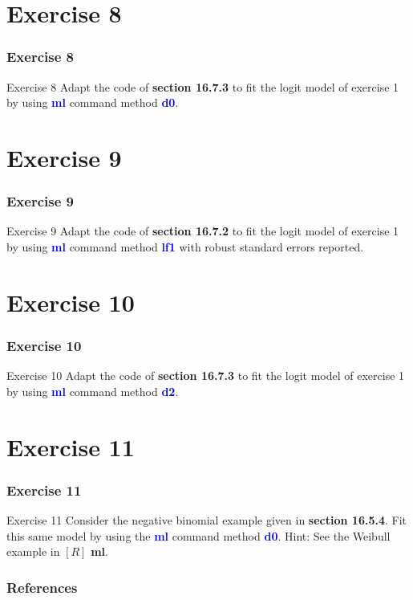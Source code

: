 \documentclass[11pt, aspectratio=169]{beamer}
\begin{document}
	\section{Exercise 8}
		\begin{frame}
			\frametitle{Exercise 8}
			\begin{block}{Exercise 8}
				Adapt the code of \textcolor{red!50}{\textbf{section 16.7.3}} to fit the logit model of exercise 1 by using
				\textcolor{blue}{\textbf{ml}} command method \textcolor{blue}{\textbf{d0}}.
			\end{block}
		\end{frame}
	\section{Exercise 9}
		\begin{frame}
			\frametitle{Exercise 9}
			\begin{block}{Exercise 9}
				Adapt the code of \textcolor{red!50}{\textbf{section 16.7.2}} to fit the logit model of exercise 1 by using
				\textcolor{blue}{\textbf{ml}} command method \textcolor{blue}{\textbf{lf1}} with robust standard errors reported.
			\end{block}
		\end{frame}
	\section{Exercise 10}
		\begin{frame}
			\frametitle{Exercise 10}
			\begin{block}{Exercise 10}
				Adapt the code of \textcolor{red!50}{\textbf{section 16.7.3}} to fit the logit model of exercise 1 by using
				\textcolor{blue}{\textbf{ml}} command method \textcolor{blue}{\textbf{d2}}.
			\end{block}
		\end{frame}
	\section{Exercise 11}
		\begin{frame}
			\frametitle{Exercise 11}
			\begin{block}{Exercise 11}
				Consider the negative binomial example given in \textcolor{red!50}{\textbf{section 16.5.4}}. Fit this same
				model by using the \textcolor{blue}{\textbf{ml}} command method \textcolor{blue}{\textbf{d0}}. Hint: See the Weibull example
				in $[R]$ \textbf{ml}.
			\end{block}
		\end{frame}
	\begin{frame}[t,allowframebreaks]
		\frametitle{References}
		
		
		\nocite{cameron2022-I}
		\nocite{cameron2022-II}
	\end{frame}
	\begin{frame}
		\maketitle
	\end{frame}
\end{document}
